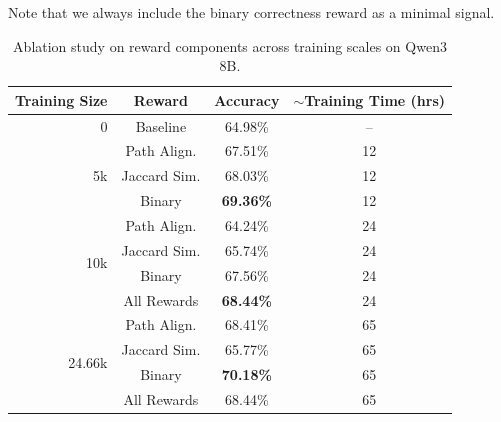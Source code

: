 \documentclass{article}
\theoremstyle{plain}
\theoremstyle{definition}
\theoremstyle{remark}
\begin{document}
Note that we always include the binary correctness reward as a minimal signal.

\begin{table}[ht]
\caption{Ablation study on reward components across training scales on Qwen3 8B.}
\label{tab:reward_ablation}
\vskip 0.15in
\begin{center}
\begin{small}
\begin{sc}
\begin{tabular}{rccc}
\toprule
Training Size & Reward & Accuracy & $\sim$Training Time (hrs) \\
\midrule
0 & Baseline & 64.98\% & -- \\
\midrule
\multirow{3}{*}{5k} 
  & Path Align. & 67.51\% & 12 \\
  & Jaccard Sim. & 68.03\% & 12 \\
  & Binary & \textbf{69.36\%} & 12 \\
\midrule
\multirow{4}{*}{10k} 
  & Path Align. & 64.24\% & 24 \\
  & Jaccard Sim. & 65.74\% & 24 \\
  & Binary & 67.56\% & 24 \\
  & All Rewards & \textbf{68.44\%} & 24 \\
\midrule
\multirow{4}{*}{24.66k} 
  & Path Align. & 68.41\% & 65 \\
  & Jaccard Sim. & 65.77\% & 65 \\
  & Binary & \textbf{70.18\%} & 65 \\
  & All Rewards & 68.44\% & 65 \\
\bottomrule
\end{tabular}
\end{sc}
\end{small}
\end{center}
\vskip -0.1in
\end{table}
\end{document}
